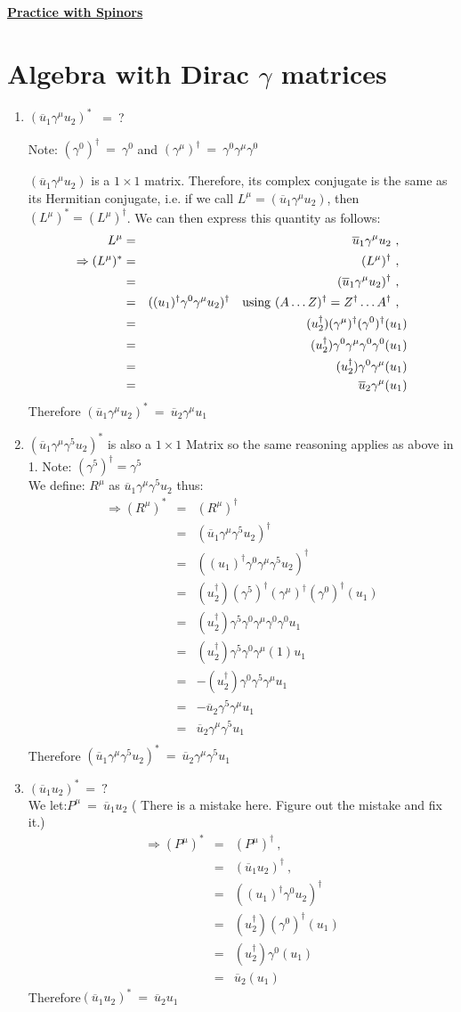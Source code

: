 \documentclass[12pt]{article}
\def \bea{\begin{eqnarray}}
\def \eea{\end{eqnarray}}
\def \nn{\nonumber}
\def \nl{\nn \\}
\def \ou{\overline{u}}
\def \ga{\gamma}
\begin{document}
\begin{center}
\underline{\textbf{\Large Practice with Spinors}}
\end{center}

\section{Algebra with Dirac $\ga$ matrices}

\begin{enumerate}

\item$(\ou_1\ga^\mu u_2)^*$ ~=~?

Note: $(\ga^0)^\dag~=~\ga^0$ and $(\ga^\mu)^\dag~=~ \ga^0\ga^\mu\ga^0$

$(\ou_1\ga^\mu u_2)$ is a $1\times1$ matrix. Therefore, its complex conjugate is the same as its Hermitian conjugate, i.e. if we call
$L^\mu = (\ou_1\ga^\mu u_2)$, then $(L^\mu)^* = (L^\mu)^\dag$. We can then express this quantity as follows:
\bea
L^\mu &=& \ou_1\ga^\mu u_2 ~,~~ \nonumber \\ \nonumber
\Rightarrow (L^\mu)^* &=& (L^\mu)^\dag ~,~~ \nl
&=& (\ou_1\ga^\mu u_2)^\dag ~,~~ \nl
&=& ((u_1)^\dag\ga^0\ga^\mu u_2)^\dag ~~~{\rm using}~(A\ldots Z)^\dag = Z^\dag\ldots A^\dag ~,~~ \nl
&=& (u_2^\dag)(\ga^\mu)^\dag(\ga^0)^\dag(u_1)\nl
&=& (u_2^\dag)\ga^0\ga^\mu\ga^0\ga^0(u_1)\nl
&=& (u_2^\dag)\ga^0\ga^\mu(u_1)\nl
&=& \ou_2\ga^\mu(u_1) \nonumber
\eea \nonumber
Therefore $(\ou_1\ga^\mu u_2)^*~=~\ou_2\ga^\mu u_1 $
%
\item $(\ou_1\ga^\mu \ga^5 u_2)^*$ is also a $1\times1$ Matrix so the same reasoning applies as above in 1. Note: $(\ga^5)^\dag = \ga^5$\nl
We define: $R^\mu$ as $\ou_1\ga^\mu\ga^5 u_2$ thus:
\bea
\Rightarrow (R^\mu)^* &=& (R^\mu)^\dag \nl
&=&(\ou_1\ga^\mu\ga^5 u_2)^\dag  \nl
&=& ((u_1)^\dag\ga^0\ga^\mu\ga^5 u_2)^\dag \nl
&=& (u_2^\dag)(\ga^5)^\dag(\ga^\mu)^\dag(\ga^0)^\dag(u_1)\nl
&=& (u_2^\dag)\ga^5\ga^0\ga^\mu\ga^0\ga^0 u_1\nl
&=& (u_2^\dag)\ga^5\ga^0\ga^\mu(1) u_1\nl
&=& -(u_2^\dag)\ga^0\ga^5\ga^\mu u_1\nl
&=& -\ou_2\ga^5\ga^\mu u_1\nl
&=& \ou_2\ga^\mu\ga^5 u_1\nl\nonumber
\eea \nonumber
%
Therefore $(\ou_1\ga^\mu \ga^5 u_2)^*~=~\ou_2 \ga^\mu \ga^5 u_1$
\item $ (\ou_1 u_2)^* ~=~ ?$ \nl
We let:$P^\mu ~=~ \ou_1 u_2$ ({\color{red} There is a mistake here. Figure out the mistake and fix it.})
\bea
\Rightarrow (P^\mu)^* &=& (P^\mu)^\dag ~,~~ \nl
&=& (\ou_1 u_2)^\dag ~,~~ \nl
&=& ((u_1)^\dag\ga^0 u_2)^\dag \nl
&=& (u_2^\dag)(\ga^0)^\dag(u_1)\nl
&=& (u_2^\dag)\ga^0(u_1)\nl
&=& \ou_2(u_1) \nonumber
\eea \nonumber
%
Therefore$(\ou_1 u_2)^* ~=~ \ou_2 u_1$


\end{enumerate}
\end{document}
